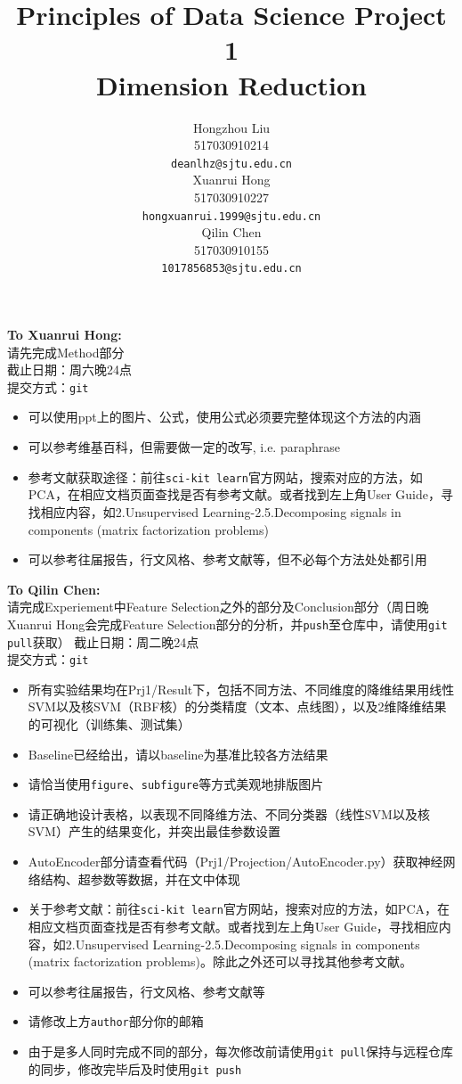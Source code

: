 \documentclass{article}
\title{Principles of Data Science Project 1\\
        Dimension Reduction}
\author{
  Hongzhou Liu \\
  517030910214 \\
  \texttt{deanlhz@sjtu.edu.cn} \\
  \And
  Xuanrui Hong \\
  517030910227 \\
  \texttt{hongxuanrui.1999@sjtu.edu.cn} \\
  \And
  Qilin Chen \\
  517030910155 \\
  \texttt{1017856853@sjtu.edu.cn} \\
}
\begin{document}


\maketitle

\textbf{To Xuanrui Hong:}\\
请先完成Method部分\\
截止日期：周六晚24点\\
提交方式：\texttt{git}\\
\begin{itemize}
  \item 可以使用ppt上的图片、公式，使用公式必须要完整体现这个方法的内涵
  \item 可以参考维基百科，但需要做一定的改写, i.e. paraphrase
  \item 参考文献获取途径：前往\texttt{sci-kit learn}官方网站，搜索对应的方法，如PCA，在相应文档页面查找是否有参考文献。或者找到左上角User Guide，寻找相应内容，如2.Unsupervised Learning-2.5.Decomposing signals in components (matrix factorization problems)
  \item 可以参考往届报告，行文风格、参考文献等，但不必每个方法处处都引用
\end{itemize}

\textbf{To Qilin Chen:}\\
请完成Experiement中Feature Selection之外的部分及Conclusion部分（周日晚Xuanrui Hong会完成Feature Selection部分的分析，并\texttt{push}至仓库中，请使用\texttt{git pull}获取）
截止日期：周二晚24点 \\
提交方式：\texttt{git} \\
\begin{itemize}
  \item 所有实验结果均在Prj1/Result下，包括不同方法、不同维度的降维结果用线性SVM以及核SVM（RBF核）的分类精度（文本、点线图），以及2维降维结果的可视化（训练集、测试集）
  \item Baseline已经给出，请以baseline为基准比较各方法结果
  \item 请恰当使用\texttt{figure}、\texttt{subfigure}等方式美观地排版图片
  \item 请正确地设计表格，以表现不同降维方法、不同分类器（线性SVM以及核SVM）产生的结果变化，并突出最佳参数设置
  \item AutoEncoder部分请查看代码（Prj1/Projection/AutoEncoder.py）获取神经网络结构、超参数等数据，并在文中体现
  \item 关于参考文献：前往\texttt{sci-kit learn}官方网站，搜索对应的方法，如PCA，在相应文档页面查找是否有参考文献。或者找到左上角User Guide，寻找相应内容，如2.Unsupervised Learning-2.5.Decomposing signals in components (matrix factorization problems)。除此之外还可以寻找其他参考文献。
  \item 可以参考往届报告，行文风格、参考文献等
  \item 请修改上方\texttt{author}部分你的邮箱
  \item 由于是多人同时完成不同的部分，每次修改前请使用\texttt{git pull}保持与远程仓库的同步，修改完毕后及时使用\texttt{git push}
\end{itemize}
\end{document}
